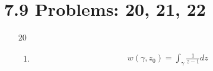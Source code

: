\documentclass{article}
\begin{document}
  \section{7.9 Problems: 20, 21, 22}
  \begin{enumerate}
    \item[20]
      \begin{enumerate}[label=(\roman*)]
        \item
          \begin{align*}
            w(\gamma,z_0)=\int_{\gamma}\frac{1}{z-1}dz
          \end{align*}
      \end{enumerate}
  \end{enumerate}
\end{document}
